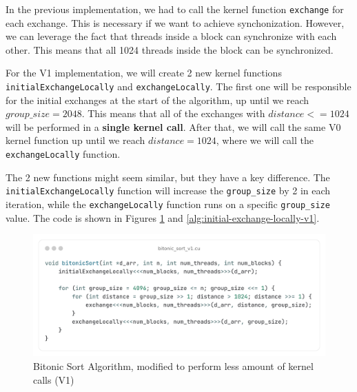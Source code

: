 \documentclass{article}
\begin{document}
In the previous implementation, we had to call the kernel function \texttt{exchange} for each exchange. This is necessary
if we want to achieve synchonization. However, we can leverage the fact that threads inside a block can synchronize with each
other. This means that all 1024 threads inside the block can be synchronized.

For the V1 implementation, we will create 2 new kernel functions \texttt{initialExchangeLocally} and \texttt{exchangeLocally}.
The first one will be responsible for the initial exchanges at the start of the algorithm, up until we reach $group\_size = 2048$.
This means that all of the exchanges with $distance <= 1024$ will be performed in a \textbf{single kernel call}. After that, we 
will call the same V0 kernel function up until we reach $distance = 1024$, where we will call the \texttt{exchangeLocally} function.

The 2 new functions might seem similar, but they have a key difference. The \texttt{initialExchangeLocally} function will increase
the \texttt{group\_size} by 2 in each iteration, while the \texttt{exchangeLocally} function runs on a specific \texttt{group\_size} value. 
The code is shown in Figures \ref{alg:bitonic-sort-v1} and \ref{alg:initial-exchange-locally-v1}.

\begin{figure}[H]
    \centering
    \includegraphics[width=1\textwidth]{bitonic_sort_v1.png}
    \caption{Bitonic Sort Algorithm, modified to perform less amount of kernel calls (V1)}
    \label{alg:bitonic-sort-v1}
\end{figure}
\end{document}
